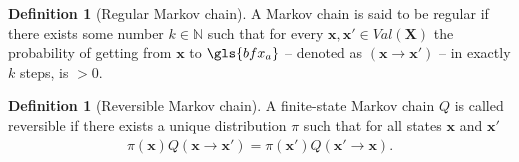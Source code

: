 \documentclass[a4paper, twoside, 11pt]{report}
\newcommand{\bfx}{{\mathbf{x}}}
\theoremstyle{plain}
\theoremstyle{definition}
\newtheorem{definition}[thm]{Definition}
\theoremstyle{remark}
\newcommand{\bfX}{{\mathbf{X}}}
\def\N{{\mathbb N}}
\begin{document}
\begin{definition}[Regular Markov chain]
A Markov chain is said to be regular if there exists some number $k \in \N$ such that for every $\bfx, \bfx' \in Val(\bfX)$ the probability of getting from $\bfx$ to $\gls{bfx_a}$ -- denoted as $(\bfx \to \bfx')$ -- in exactly $k$ steps, is $> 0$. 
\end{definition}

\begin{definition}[Reversible Markov chain]
A finite-state Markov chain $Q$ is called reversible if there exists a unique distribution $\pi$ such that for all states $\bfx$ and $\bfx'$
\begin{align}
\pi(\bfx) Q(\bfx \to \bfx') = \pi(\bfx') Q(\bfx' \to \bfx).
\end{align}
\end{definition}
\end{document}
